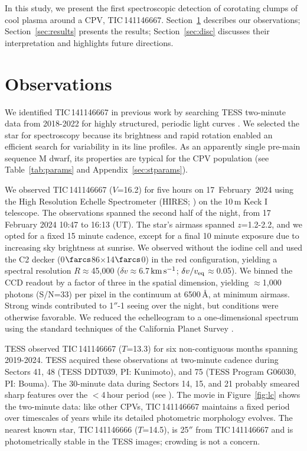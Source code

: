 \documentclass[11pt,twocolumn,tighten,linenumbers]{aastex7}
\newcommand{\kms}{\ensuremath{\rm km\,s^{-1}}}
\begin{document}
In this study, we present the first spectroscopic detection of
corotating clumps of cool plasma around a CPV, TIC\,141146667.
Section~\ref{sec:obs} describes our observations;
Section~\ref{sec:results} presents the results; Section~\ref{sec:disc}
discusses their interpretation and highlights future directions.


\section{Observations}
\label{sec:obs}

We identified TIC\,141146667 in previous work \citep{Bouma2024} by
searching TESS two-minute data from 2018-2022 for highly
structured, periodic light curves \citep{Ricker2015}.  We selected the
star for spectroscopy because its brightness and rapid rotation enabled
an efficient search for variability in its line profiles.
As an apparently single pre-main sequence M dwarf, its properties are
typical for the CPV population (see Table~\ref{tab:params} and
Appendix~\ref{sec:stparams}).

We observed TIC\,141146667 ($V$=16.2) for five hours on
17~February~2024 using the High Resolution Echelle Spectrometer
(HIRES; \citealt{vogt_hires_1994}) on the 10\,m Keck I telescope.  The
observations spanned the second half of the night, from 17 February
2024 10:47 to 16:13 (UT).  The star's airmass spanned $z$=1.2-2.2, and
we opted for a fixed 15 minute cadence, except for a final 10 minute
exposure due to increasing sky brightness at sunrise.  We observed
without the iodine cell and used the C2 decker
(0$\farcs$86$\times$14$\farcs$0) in the red configuration, yielding a
spectral resolution $R$$\approx$45{,}000 ($\delta
v$$\approx$6.7\,\kms; $\delta v / v_{\rm eq}$$\approx$0.05).  We
binned the CCD readout by a factor of three in the spatial dimension,
yielding $\approx$1,000 photons (S/N=33) per pixel in the continuum at
6500\,\AA, at minimum airmass.  Strong winds contributed to
1$''$-1 seeing over the night, but conditions were otherwise
favorable.  We reduced the echelleogram to a one-dimensional spectrum
using the standard techniques of the California Planet Survey
\citep{Howard2010}.  

TESS observed TIC\,141146667 ($T$=13.3) for six non-contiguous months
spanning 2019-2024.  TESS acquired these observations at two-minute
cadence during Sectors 41, 48 (TESS DDT039, PI: Kunimoto), and 75
(TESS Program G06030, PI: Bouma).   The 30-minute data during Sectors
14, 15, and 21 probably smeared sharp features over the $<$4\,hour
period (see \citealt{Gunther2022}).  The movie in
Figure~\ref{fig:lc} shows the two-minute data: 
like other CPVs, TIC\,141146667 maintains a fixed period over
timescales of years while its detailed photometric morphology evolves.
The nearest known star, TIC\,141146666 ($T$=14.5), is 25$''$ from
TIC\,141146667 and is photometrically stable in the TESS images;
crowding is not a concern.
\end{document}
